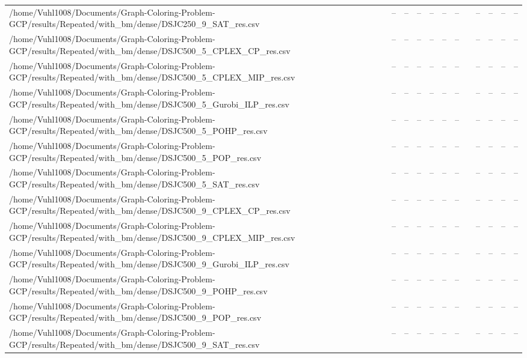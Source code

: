 \begin{table}[htbp]
\begin{tabular}{llllllllllll}
/home/Vuhl1008/Documents/Graph-Coloring-Problem-GCP/results/Repeated/with\_bm/dense/DSJC250\_9\_SAT\_res.csv & -- & -- & -- & -- & -- & -- & {} & -- & -- & -- & -- \\
/home/Vuhl1008/Documents/Graph-Coloring-Problem-GCP/results/Repeated/with\_bm/dense/DSJC500\_5\_CPLEX\_CP\_res.csv & -- & -- & -- & -- & -- & -- & {} & -- & -- & -- & -- \\
/home/Vuhl1008/Documents/Graph-Coloring-Problem-GCP/results/Repeated/with\_bm/dense/DSJC500\_5\_CPLEX\_MIP\_res.csv & -- & -- & -- & -- & -- & -- & {} & -- & -- & -- & -- \\
/home/Vuhl1008/Documents/Graph-Coloring-Problem-GCP/results/Repeated/with\_bm/dense/DSJC500\_5\_Gurobi\_ILP\_res.csv & -- & -- & -- & -- & -- & -- & {} & -- & -- & -- & -- \\
/home/Vuhl1008/Documents/Graph-Coloring-Problem-GCP/results/Repeated/with\_bm/dense/DSJC500\_5\_POHP\_res.csv & -- & -- & -- & -- & -- & -- & {} & -- & -- & -- & -- \\
/home/Vuhl1008/Documents/Graph-Coloring-Problem-GCP/results/Repeated/with\_bm/dense/DSJC500\_5\_POP\_res.csv & -- & -- & -- & -- & -- & -- & {} & -- & -- & -- & -- \\
/home/Vuhl1008/Documents/Graph-Coloring-Problem-GCP/results/Repeated/with\_bm/dense/DSJC500\_5\_SAT\_res.csv & -- & -- & -- & -- & -- & -- & {} & -- & -- & -- & -- \\
/home/Vuhl1008/Documents/Graph-Coloring-Problem-GCP/results/Repeated/with\_bm/dense/DSJC500\_9\_CPLEX\_CP\_res.csv & -- & -- & -- & -- & -- & -- & {} & -- & -- & -- & -- \\
/home/Vuhl1008/Documents/Graph-Coloring-Problem-GCP/results/Repeated/with\_bm/dense/DSJC500\_9\_CPLEX\_MIP\_res.csv & -- & -- & -- & -- & -- & -- & {} & -- & -- & -- & -- \\
/home/Vuhl1008/Documents/Graph-Coloring-Problem-GCP/results/Repeated/with\_bm/dense/DSJC500\_9\_Gurobi\_ILP\_res.csv & -- & -- & -- & -- & -- & -- & {} & -- & -- & -- & -- \\
/home/Vuhl1008/Documents/Graph-Coloring-Problem-GCP/results/Repeated/with\_bm/dense/DSJC500\_9\_POHP\_res.csv & -- & -- & -- & -- & -- & -- & {} & -- & -- & -- & -- \\
/home/Vuhl1008/Documents/Graph-Coloring-Problem-GCP/results/Repeated/with\_bm/dense/DSJC500\_9\_POP\_res.csv & -- & -- & -- & -- & -- & -- & {} & -- & -- & -- & -- \\
/home/Vuhl1008/Documents/Graph-Coloring-Problem-GCP/results/Repeated/with\_bm/dense/DSJC500\_9\_SAT\_res.csv & -- & -- & -- & -- & -- & -- & {} & -- & -- & -- & -- \\

\end{tabular}
\end{table}
